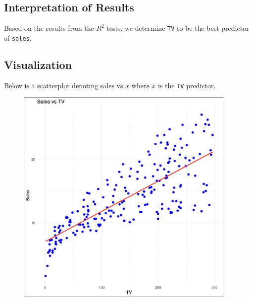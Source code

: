 \documentclass{article}
\theoremstyle{mytheoremstyle}
\theoremstyle{mytheoremstyle}
\theoremstyle{myproblemstyle}
\begin{document}
    \subsection{Interpretation of Results}
    Based on the results from the $R^2$ tests, we determine \verb|TV| to be the best predictor of \verb|sales|.
    \vspace{0.1in}
    \subsection{Visualization}
    Below is a scatterplot denoting sales vs $x$ where $x$ is the \verb|TV| predictor.
    \vspace{0.1in}
    \begin{figure}[h]
      \begin{center}
        \includegraphics[width=0.95\textwidth]{sales_vs_tv.png}
      \end{center}
    \end{figure}
\end{document}
